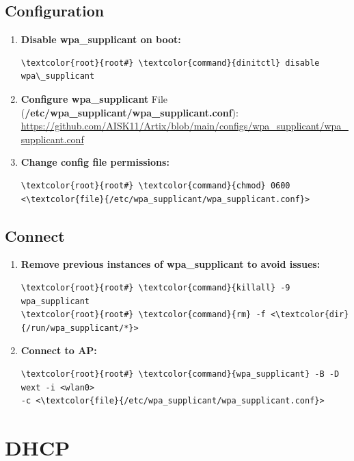 \documentclass[10pt, a4paper, onecolumn, oneside, titlepage, openany]{book}
\begin{document}
\subsection{Configuration}
\begin{enumerate}
    \item \textbf{Disable wpa\_supplicant on boot:}
\begin{Verbatim}[commandchars=\\\{\}]
\textcolor{root}{root#} \textcolor{command}{dinitctl} disable wpa\_supplicant
\end{Verbatim}
    \item \textbf{Configure wpa\_supplicant}
\newline File (\textbf{\textcolor{file}{/etc/wpa\_supplicant/wpa\_supplicant.conf}}):
\newline \url{https://github.com/AISK11/Artix/blob/main/configs/wpa_supplicant/wpa_supplicant.conf}
    \item \textbf{Change config file permissions:}
\begin{Verbatim}[commandchars=\\\{\}]
\textcolor{root}{root#} \textcolor{command}{chmod} 0600 <\textcolor{file}{/etc/wpa_supplicant/wpa_supplicant.conf}>
\end{Verbatim}
\end{enumerate}
\subsection{Connect}
\begin{enumerate}
    \item \textbf{Remove previous instances of wpa\_supplicant to avoid issues:}
\begin{Verbatim}[commandchars=\\\{\}]
\textcolor{root}{root#} \textcolor{command}{killall} -9 wpa_supplicant
\textcolor{root}{root#} \textcolor{command}{rm} -f <\textcolor{dir}{/run/wpa_supplicant/*}>
\end{Verbatim}
    \item \textbf{Connect to AP:}
\begin{Verbatim}[commandchars=\\\{\}]
\textcolor{root}{root#} \textcolor{command}{wpa_supplicant} -B -D wext -i <wlan0>
-c <\textcolor{file}{/etc/wpa_supplicant/wpa_supplicant.conf}>
\end{Verbatim}
\end{enumerate}

\section{DHCP}
\end{document}

